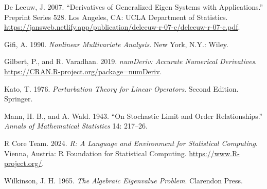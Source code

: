 \documentclass[
  12pt,
  letterpaper,
  DIV=11,
  numbers=noendperiod]{scrartcl}
\newlength{\cslhangindent}
\newenvironment{CSLReferences}[2] %
 {\begin{list}{}{%
  \setlength{\itemindent}{0pt}
  \setlength{\leftmargin}{0pt}
  \setlength{\parsep}{0pt}
  \ifodd #1
   \setlength{\leftmargin}{\cslhangindent}
   \setlength{\itemindent}{-1\cslhangindent}
  \fi
  \setlength{\itemsep}{#2\baselineskip}}}
 {\end{list}}
\begin{document}
\label{refs}
\begin{CSLReferences}{1}{0}
De Leeuw, J. 2007. {``Derivatives of Generalized Eigen Systems with
Applications.''} Preprint Series 528. Los Angeles, CA: UCLA Department
of Statistics.
\url{https://jansweb.netlify.app/publication/deleeuw-r-07-c/deleeuw-r-07-c.pdf}.

Gifi, A. 1990. \emph{Nonlinear Multivariate Analysis}. New York, N.Y.:
Wiley.

Gilbert, P., and R. Varadhan. 2019. \emph{{numDeriv: Accurate Numerical
Derivatives}}. \url{https://CRAN.R-project.org/package=numDeriv}.

Kato, T. 1976. \emph{Perturbation Theory for Linear Operators}. Second
Edition. Springer.

Mann, H. B., and A. Wald. 1943. {``{On Stochastic Limit and Order
Relationships}.''} \emph{Annals of Mathematical Statistics} 14: 217--26.

R Core Team. 2024. \emph{R: A Language and Environment for Statistical
Computing}. {Vienna, Austria}: R Foundation for Statistical Computing.
\url{https://www.R-project.org/}.

Wilkinson, J. H. 1965. \emph{{The Algebraic Eigenvalue Problem}}.
Clarendon Press.

\end{CSLReferences}
\end{document}
